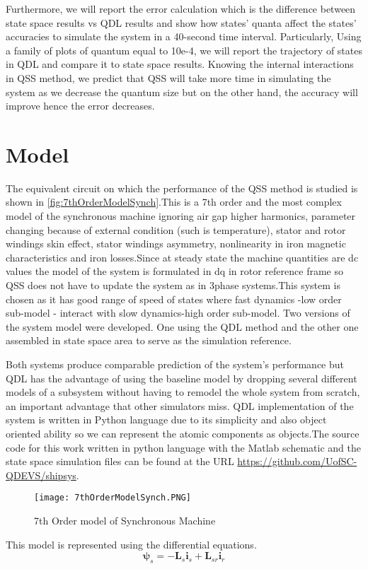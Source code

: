\documentclass{scspaperproc}
\theoremstyle{scsthe}
\begin{document}
Furthermore, we will report the error calculation which is the difference between state space results vs QDL results and show how states' quanta affect the states' accuracies to simulate the system in a 40-second time interval. Particularly, Using a family of plots of quantum equal to 10e-4, we will report the trajectory of states in QDL and compare it to state space results. Knowing the internal interactions in QSS method, we predict that QSS will take more time in simulating the system as we decrease the quantum size but on the other hand, the accuracy will improve hence the error decreases.

\section{Model}

The equivalent circuit on which the performance of the QSS method is studied is shown in \autoref{fig:7thOrderModelSynch}.This is a 7th order and the most complex model of the synchronous machine ignoring air gap higher harmonics, parameter changing because of external condition (such is temperature), stator and rotor windings skin effect, stator windings asymmetry, nonlinearity in iron magnetic characteristics and iron losses.Since at steady state the machine quantities are dc values the model of the system is formulated in dq in rotor reference frame so QSS does not have to update the system as in 3phase systems.This system is chosen as it has good range of speed of states where fast dynamics -low order sub-model - interact with slow dynamics-high order sub-model. Two versions of the system model were developed. One using the QDL method and the other one assembled in state space area to serve as the simulation reference. 

Both systems produce comparable prediction of the system's performance but QDL has the advantage of using the baseline model by dropping several different models of a subsystem without having to remodel the whole system from scratch, an important advantage that other simulators miss. QDL implementation of the system is written in Python language due to its simplicity and also object oriented ability so we can represent the atomic components as objects.The source code for this work written in python language with the Matlab schematic and the state space simulation files can be found at the URL \href{https://github.com/UofSC-QDEVS/shipsys} {https://github.com/UofSC-QDEVS/shipsys}.

\begin{figure}[H]
    \centering
    \texttt{[image: 7thOrderModelSynch.PNG]}
    \caption{7th Order model of Synchronous Machine}
    \label{fig:7thOrderModelSynch}
\end{figure}
This model is represented using the differential equations. 
\begin{equation} \label{eq:lim_dependent_branch}
{\mathbf \psi}_{s} = -{\mathbf L}_{s} {\mathbf i}_{s}+{\mathbf L}_{sr} {\mathbf i}_{r}
\end{equation}
\end{document}
